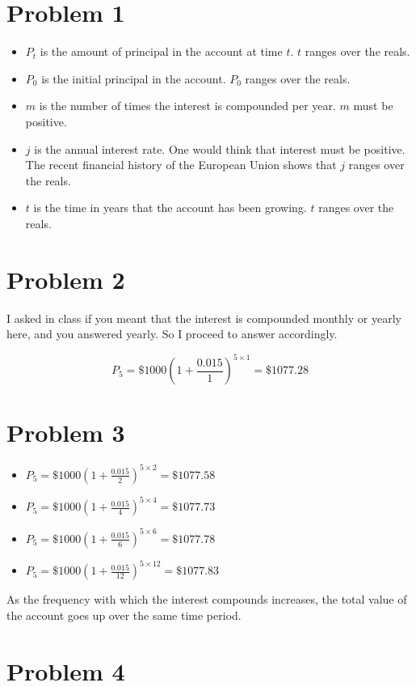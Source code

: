 \documentclass[12pt]{article}
\begin{document}
\section*{Problem 1}
\begin{itemize}
	\item $P_t$ is the amount of principal in the account at time $t$. $t$ ranges over the reals.
	\item $P_0$ is the initial principal in the account. $P_0$ ranges over the reals.
	\item $m$ is the number of times the interest is compounded per year. $m$ must be positive.
	\item $j$ is the annual interest rate. One would think that interest must be positive. The recent financial history of the European Union shows that $j$ ranges over the reals.
	\item $t$ is the time in years that the account has been growing. $t$ ranges over the reals.
\end{itemize}

\section*{Problem 2}
I asked in class if you meant that the interest is compounded monthly or yearly here, and you answered yearly. So I proceed to answer accordingly.

$$P_5 = \$1000(1+\frac{0.015}{1})^{5\times 1} = \$1077.28$$

\section*{Problem 3}
\begin{itemize}
	\item $P_5 = \$1000(1+\frac{0.015}{2})^{5\times 2} = \$1077.58$
	\item $P_5 = \$1000(1+\frac{0.015}{4})^{5\times 4} = \$1077.73$
	\item $P_5 = \$1000(1+\frac{0.015}{6})^{5\times 6} = \$1077.78$
	\item $P_5 = \$1000(1+\frac{0.015}{12})^{5\times 12} = \$1077.83$
\end{itemize}

As the frequency with which the interest compounds increases, the total value of the account goes up over the same time period.

\section*{Problem 4}
\end{document}
